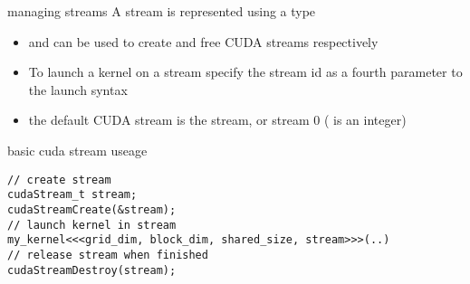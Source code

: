 \begin{frame}[fragile]{}
    \begin{info}{managing streams}
        A stream is represented using a  type
        \begin{itemize}
            \item {} and  can be used to create and free CUDA streams respectively
            \item To launch a kernel on a stream specify the stream id as a fourth parameter to the launch syntax \\
                \begin{center}  \end{center}
            \item the default CUDA stream is the  stream, or stream 0 ( is an integer)
        \end{itemize}
    \end{info}

    \begin{code}{basic cuda stream useage}
        \begin{lstlisting}[style=boxcudatiny]
// create stream
cudaStream_t stream;
cudaStreamCreate(&stream);
// launch kernel in stream
my_kernel<<<grid_dim, block_dim, shared_size, stream>>>(..)
// release stream when finished
cudaStreamDestroy(stream);
        \end{lstlisting}
\end{code}

\end{frame}

